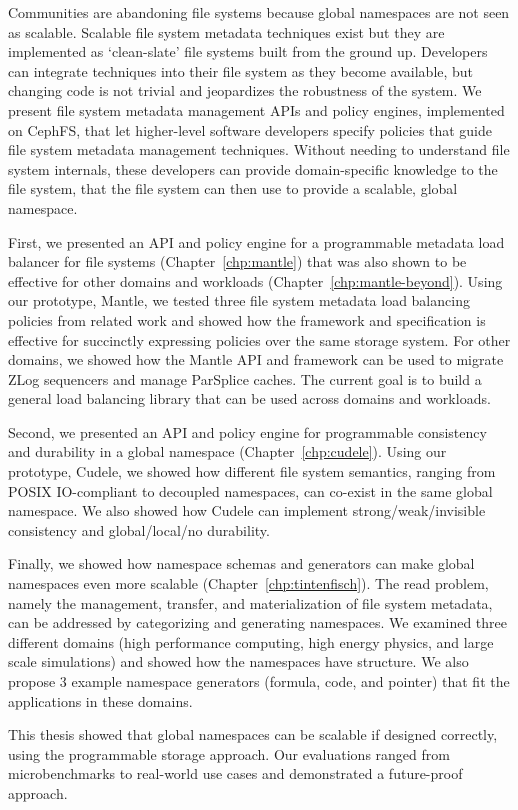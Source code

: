 Communities are abandoning file systems because global namespaces are not seen
as scalable.  Scalable file system metadata techniques exist but they are
implemented as `clean-slate' file systems built from the ground up. Developers
can integrate techniques into their file system as they become available, but
changing code is not trivial and jeopardizes the robustness of the system.  We
present file system metadata management APIs and policy engines, implemented on
CephFS, that let higher-level software developers specify policies that guide
file system metadata management techniques. Without needing to understand file
system internals, these developers can provide domain-specific knowledge to the
file system, that the file system can then use to provide a scalable, global
namespace.

First, we presented an API and policy engine for a programmable metadata load
balancer for file systems (Chapter~\ref{chp:mantle}) that was also shown to be
effective for other domains and workloads (Chapter~\ref{chp:mantle-beyond}).
Using our prototype, Mantle, we tested three file system metadata load
balancing policies from related work and showed how the framework and
specification is effective for succinctly expressing policies over the same
storage system. For other domains, we showed how the Mantle API and framework
can be used to migrate ZLog sequencers and manage ParSplice caches. The current
goal is to build a general load balancing library that can be used across
domains and workloads.

Second, we presented an API and policy engine for programmable consistency and
durability in a global namespace (Chapter~\ref{chp:cudele}). Using our
prototype, Cudele, we showed how different file system semantics, ranging from
POSIX IO-compliant to decoupled namespaces, can co-exist in the same global
namespace. We also showed how Cudele can implement strong/weak/invisible
consistency and global/local/no durability.

Finally, we showed how namespace schemas and generators can make global
namespaces even more scalable (Chapter~\ref{chp:tintenfisch}). The read
problem, namely the management, transfer, and materialization of file system
metadata, can be addressed by categorizing and generating namespaces. We
examined three different domains (high performance computing, high energy
physics, and large scale simulations) and showed how the namespaces have
structure. We also propose 3 example namespace generators (formula, code, and
pointer) that fit the applications in these domains.

This thesis showed that global namespaces can be scalable if designed
correctly, using the programmable storage approach. Our evaluations ranged from
microbenchmarks to real-world use cases and demonstrated a future-proof
approach.
